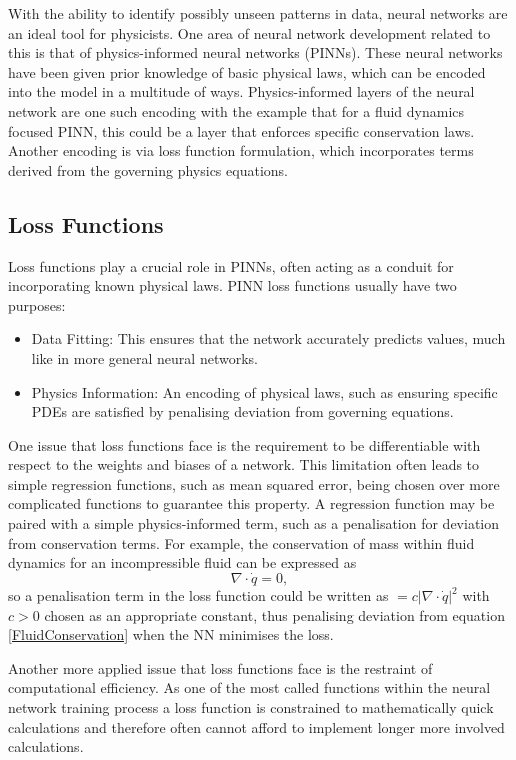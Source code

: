 \documentclass[10pt]{iopart}
\begin{document}
With the ability to identify possibly unseen patterns in data, neural networks are an ideal tool for physicists. One area of neural network development related to this is that of physics-informed neural networks (PINNs). These neural networks have been given prior knowledge of basic physical laws, which can be encoded into the model in a multitude of ways.
Physics-informed layers of the neural network are one such encoding with the example that for a fluid dynamics focused PINN, this could be a layer that enforces specific conservation laws.
 Another encoding is via loss function formulation, which incorporates terms derived from the governing physics equations.
 
\subsection{Loss Functions}
Loss functions play a crucial role in PINNs, often acting as a conduit for incorporating known physical laws. PINN loss functions usually have two purposes:
\begin{itemize}
	\item Data Fitting: This ensures that the network accurately predicts values, much like in more general neural networks.
	\item Physics Information: An encoding of physical laws, such as ensuring specific PDEs are satisfied by penalising deviation from governing equations.
\end{itemize}
One issue that loss functions face is the requirement to be differentiable with respect to the weights and biases of a network. This limitation often leads to simple regression functions, such as mean squared error, being chosen over more complicated functions to guarantee this property. A regression function may be paired with a simple physics-informed term, such as a penalisation for deviation from conservation terms. For example, the conservation of mass within fluid dynamics for an incompressible fluid can be expressed as 
\begin{equation}
\label{FluidConservation}
	\nabla \cdot\dot q = 0,
\end{equation}
 so a penalisation term in the loss function could be written as $=c|\nabla \cdot \dot q|^2$ with $c>0$ chosen as an appropriate constant, thus penalising deviation from equation \ref{FluidConservation} when the NN minimises the loss.

Another more applied issue that loss functions face is the restraint of computational efficiency. As one of the most called functions within the neural network training process a loss function is constrained to mathematically quick calculations and therefore often cannot afford to implement longer more involved calculations. 
\end{document}
